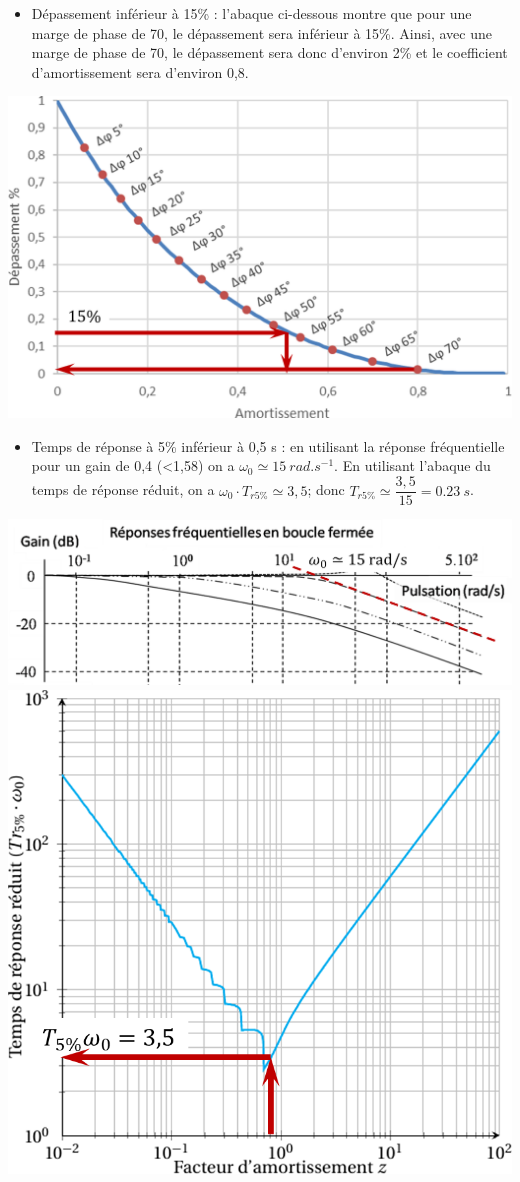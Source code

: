 \documentclass[10pt,fleqn]{article} %
\begin{document}
\begin{multicols}{2}
\begin{corrige}
\begin{itemize}
\item Dépassement inférieur à 15\% : l'abaque ci-dessous montre que pour une marge de phase de 70\degres, le dépassement sera inférieur à 15\%. Ainsi, avec une marge de phase de 70\degres, le dépassement sera donc d'environ 2\% et le coefficient d'amortissement sera d'environ 0,8. 
\end{itemize}
\begin{center}
\includegraphics[width=.5\linewidth]{images/abaque_cor}
\end{center}
\begin{itemize}
\item Temps de réponse à 5\% inférieur à 0,5 s : en utilisant la réponse fréquentielle pour un gain de 0,4 (<1,58) on a $\omega_0\simeq \SI {15}{rad.s^{-1}}$. En utilisant l'abaque du temps de réponse réduit, on a  $\omega_0 \cdot T_{r5\%}\simeq 3,5$; donc $T_{r5\%}\simeq \dfrac{3,5}{15} = \SI{0,23}{s}$. 

\end{itemize}

\begin{center}
\includegraphics[width=.45\linewidth]{images/bf_cor} \hfill
\includegraphics[width=.45\linewidth]{images/abaque_tr_cor}
\end{center}


\end{corrige}
\end{multicols}
\end{document}
